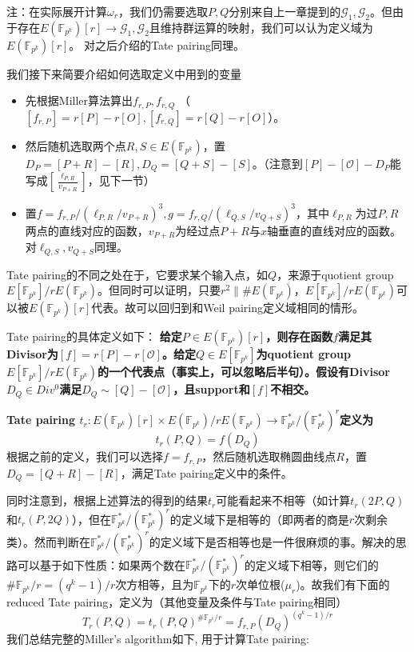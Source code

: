 \documentclass[12pt]{article}
\newcommand{\ec}{椭圆曲线}
\newcommand{\oo}{\mathcal{O}}
\newcommand{\fpk}{\mathbb{F}_{p^k}}
\begin{document}
注：在实际展开计算$\omega_r$，我们仍需要选取$P,Q$分别来自上一章提到的$\mathcal{G}_1,\mathcal{G}_2$。但由于存在$E(\fpk)[r] \rightarrow \mathcal{G}_1,\mathcal{G}_2$且维持群运算的映射，我们可以认为定义域为$E(\fpk)[r]$。 对之后介绍的Tate pairing同理。

我们接下来简要介绍如何选取定义中用到的变量
\begin{itemize}
    \item 先根据Miller算法算出$f_{r,P},f_{r,Q}$ （$[f_{r,P}]=r[P]-r[O], [f_{r,Q}]=r[Q]-r[O]$）。
    \item 然后随机选取两个点$R,S \in E(\fpk)$，置$D_P = [P+R]-[R], D_Q = [Q+S]-[S]$。（注意到$[P]-[\oo]-D_P$能写成$[\frac{\ell_{P,R}}{v_{P+R}}]$，见下一节）
    \item 置$f = f_{r,P}/(\ell_{P,R}/v_{P+R})^3, g = f_{r,Q}/(\ell_{Q,S}/v_{Q+S})^3$，其中$\ell_{P,R}$为过$P,R$两点的直线对应的函数，$v_{P+R}$为经过点$P+R$与$x$轴垂直的直线对应的函数。对$\ell_{Q,S},v_{Q+S}$同理。
\end{itemize}
Tate pairing的不同之处在于，它要求某个输入点，如$Q$，来源于quotient group $E[\fpk]/rE(\fpk)$。但同时可以证明，只要$r^2 \| \#E(\fpk)$，$E[\fpk]/rE(\fpk)$可以被$E(\fpk)[r]$代表。故可以回归到和Weil pairing定义域相同的情形。

Tate pairing的具体定义如下：
\textbf{给定$P\in E(\fpk)[r]$，则存在函数$f$满足其Divisor为$[f]=r[P]-r[\oo]$。给定$Q \in E[\fpk]$为quotient group $E[\fpk]/rE(\fpk)$的一个代表点（事实上，可以忽略后半句）。假设有Divisor $D_Q \in Div^0$满足$D_Q \sim [Q]-[\oo]$，且support和$[f]$不相交。}

\textbf{Tate pairing $t_r: E(\fpk)[r]\times E(\fpk)/rE(\fpk) \rightarrow \fpk^*/(\fpk^*)^r$定义为
	$$ t_r(P,Q)= f(D_Q)$$
}
根据之前的定义，我们可以选择$f=f_{r,P}$，然后随机选取\ec 点$R$，置$D_Q=[Q+R]-[R]$，满足Tate pairing定义中的条件。

同时注意到，根据上述算法的得到的结果$t_r$可能看起来不相等（如计算$t_r(2P,Q)$和$t_r(P,2Q)$），但在$\fpk^*/(\fpk^*)^r$的定义域下是相等的（即两者的商是$r$次剩余类）。然而判断在$\fpk^*/(\fpk^*)^r$的定义域下是否相等也是一件很麻烦的事。解决的思路可以基于如下性质：如果两个数在$\fpk^*/(\fpk^*)^r$的定义域下相等，则它们的$\# \fpk/r=(q^k-1)/r$次方相等，且为$\fpk$下的$r$次单位根($\mu_r$)。故我们有下面的reduced Tate pairing，定义为（其他变量及条件与Tate pairing相同）
$$T_r(P,Q) = t_r(P,Q)^{\# \fpk/r} = f_{r,P}(D_Q)^{(q^k-1)/r}$$
我们总结完整的Miller's algorithm如下, 用于计算Tate pairing:
\end{document}
